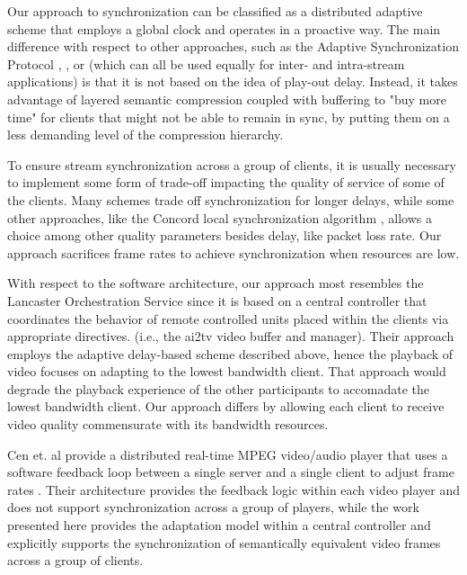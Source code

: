 \documentclass{sig-alternate}
\begin{document}
Our approach to synchronization can be classified as a distributed
adaptive scheme that employs a global clock and operates in a
proactive way.  The main difference with respect to other approaches,
such as the Adaptive Synchronization Protocol \cite{ASP},
\cite{GONZALEZ}, or \cite{LIU} (which can all be used equally for
inter- and intra-stream applications) is that it is not based on the
idea of play-out delay.  Instead, it takes advantage of layered
semantic compression coupled with buffering to "buy more time" for
clients that might not be able to remain in sync, by putting them on a
less demanding level of the compression hierarchy.

To ensure stream synchronization across a group of clients, it is
usually necessary to implement some form of trade-off impacting the
quality of service of some of the clients.  Many schemes trade off
synchronization for longer delays, while some other approaches, like
the Concord local synchronization algorithm \cite{Concord}, allows a
choice among other quality parameters besides delay, like packet loss
rate.  Our approach sacrifices frame rates to achieve synchronization
when resources are low.

With respect to the software architecture, our approach most resembles
the Lancaster Orchestration Service \cite{Lancaster} since it is based
on a central controller that coordinates the behavior of remote
controlled units placed within the clients via appropriate directives.
(i.e., the ai2tv video buffer and manager).  Their approach employs
the adaptive delay-based scheme described above, hence the playback of
video focuses on adapting to the lowest bandwidth client.  That
approach would degrade the playback experience of the other
participants to accomadate the lowest bandwidth client.  Our approach
differs by allowing each client to receive video quality commensurate
with its bandwidth resources.

Cen et. al provide a distributed real-time MPEG video/audio player
that uses a software feedback loop between a single server and a
single client to adjust frame rates \cite{CEN}.  Their architecture
provides the feedback logic within each video player and does not
support synchronization across a group of players, while the work
presented here provides the adaptation model within a central
controller and explicitly supports the synchronization of semantically
equivalent video frames across a group of clients.
\end{document}
